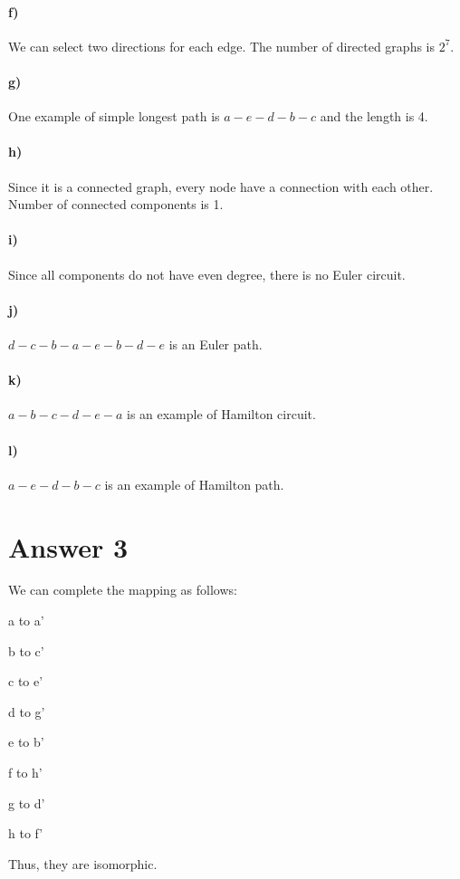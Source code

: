 \documentclass[12pt]{article}
\begin{document}
\paragraph*{f)} We can select two directions for each edge. The number of directed graphs is $2^7$.

\paragraph*{g)} One example of simple longest path is $a-e-d-b-c$ and the length is 4.

\paragraph*{h)} Since it is a connected graph, every node have a connection with each other. Number of connected components is 1.

\paragraph*{i)} Since all components do not have even degree, there is no Euler circuit.

\paragraph*{j)} $d-c-b-a-e-b-d-e$ is an Euler path.

\paragraph*{k)} $a-b-c-d-e-a$ is an example of Hamilton circuit.

\paragraph*{l)} $a-e-d-b-c$ is an example of Hamilton path.


\section*{Answer 3}

We can complete the mapping as follows: \\
\begin{itemize}
\begin{minipage}{0.4\linewidth}
    \item a to a'
    \item b to c'
    \item c to e'
    \item d to g'
    \end{minipage}
    \begin{minipage}{0.4\linewidth}
    \item e to b'
    \item f to h'
    \item g to d'
    \item h to f'
    \end{minipage}
\end{itemize}
Thus, they are isomorphic.
\end{document}
